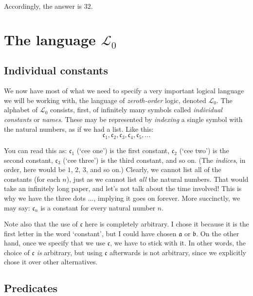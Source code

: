\begin{center}
	\begin{forest}
		[$8 \times 4$
		]
	\end{forest}
\end{center}

Accordingly, the answer is $32$. 

\section{The language $\mathcal{L}_0$}

\subsection{Individual constants}

We now have most of what we need to specify a very important logical language we will be working with, the language of \textit{zeroth-order} logic, denoted $\mathcal{L}_0$. The alphabet of $\mathcal{L}_0$ consists, first, of infinitely many symbols called \textit{individual constants} or \textit{names}. These may be represented by \textit{indexing} a single symbol with the natural numbers, as if we had a list. Like this:
\[
\mathfrak{c}_1, \mathfrak{c}_2, \mathfrak{c}_3, \mathfrak{c}_4, \mathfrak{c}_5, ...
\]

You can read this as: $\mathfrak{c}_1$ (`cee one') is the first constant, $\mathfrak{c}_2$ (`cee two') is the second constant, $\mathfrak{c}_3$ (`cee three') is the third constant, and so on. (The \textit{indices}, in order, here would be $1$, $2$, $3$, and so on.) Clearly, we cannot list all of the constants (for each $n$), just as we cannot list \textit{all} the natural numbers. That would take an infinitely long paper, and let's not talk about the time involved! This is why we have the three dots $...$, implying it goes on forever. More succinctly, we may say: $\mathfrak{c}_n$ is a constant for every natural number $n$. 

Note also that the use of $\mathfrak{c}$ here is completely arbitrary. I chose it because it is the first letter in the word `constant', but I could have chosen $\mathfrak{a}$ or $\mathfrak{b}$. On the other hand, once we specify that we use $\mathfrak{c}$, we have to stick with it. In other words, the choice of $\mathfrak{c}$ \textit{is} arbitrary, but using $\mathfrak{c}$ afterwards is not arbitrary, since we explicitly chose it over other alternatives. 

\subsection{Predicates}

